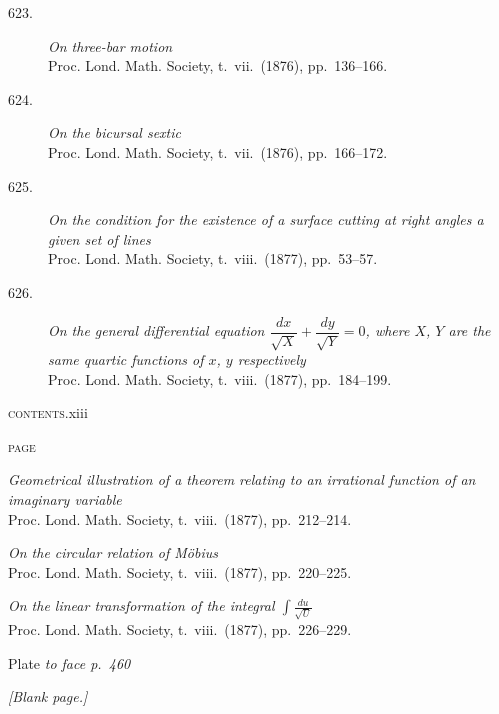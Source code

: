 \documentclass[11pt]{article}
\begin{document}
\begin{description}
\item[623.] \textit{On three-bar motion}\\
\hspace*{1em}\small Proc. Lond. Math. Society, t.~vii.\ (1876), pp.~136--166.

\item[624.] \textit{On the bicursal sextic}\\
\hspace*{1em}\small Proc. Lond. Math. Society, t.~vii.\ (1876), pp.~166--172.

\item[625.] \textit{On the condition for the existence of a surface cutting at right angles a given set of lines}\\
\hspace*{1em}\small Proc. Lond. Math. Society, t.~viii.\ (1877), pp.~53--57.

\item[626.] \textit{On the general differential equation $\dfrac{dx}{\sqrt{X}}+\dfrac{dy}{\sqrt{Y}}=0$, where $X$, $Y$ are the same quartic functions of $x$, $y$ respectively}\\
\hspace*{1em}\small Proc. Lond. Math. Society, t.~viii.\ (1877), pp.~184--199.
\end{description}
\newpage

\thispagestyle{empty}
\noindent\small\textsc{contents.}\hfill xiii
\vspace*{1em}

\noindent\hfill\textsc{page}

\medskip

\begin{description}\itemsep=2pt
\item[627.] \textit{Geometrical illustration of a theorem relating to an irrational function of an imaginary variable}\\
\hspace*{1em}\small Proc. Lond. Math. Society, t.~viii.\ (1877), pp.~212--214.

\item[628.] \textit{On the circular relation of M\"obius}\\
\hspace*{1em}\small Proc. Lond. Math. Society, t.~viii.\ (1877), pp.~220--225.

\item[629.] \textit{On the linear transformation of the integral $\displaystyle\int\frac{du}{\sqrt{U}}$}\\
\hspace*{1em}\small Proc. Lond. Math. Society, t.~viii.\ (1877), pp.~226--229.
\end{description}

\vspace{2em}
\noindent Plate \dotfill \textit{to face p.\ 460}
\newpage

\thispagestyle{empty}
\vspace*{\fill}
\begin{center}
\textit{[Blank page.]}
\end{center}
\vspace*{\fill}
\end{document}
